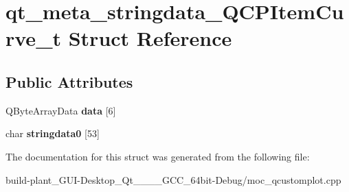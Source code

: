 \hypertarget{structqt__meta__stringdata__QCPItemCurve__t}{}\section{qt\+\_\+meta\+\_\+stringdata\+\_\+\+Q\+C\+P\+Item\+Curve\+\_\+t Struct Reference}
\label{structqt__meta__stringdata__QCPItemCurve__t}
\subsection*{Public Attributes}
\begin{DoxyCompactItemize}
\item 
\mbox{\label{structqt__meta__stringdata__QCPItemCurve__t_ac6d43f09ee6cd9ad95da06d7fd942e8f}} 
Q\+Byte\+Array\+Data {\bfseries data} \mbox{[}6\mbox{]}
\item 
\mbox{\label{structqt__meta__stringdata__QCPItemCurve__t_a52ddb589fe5c4e7eba75b1eb50799729}} 
char {\bfseries stringdata0} \mbox{[}53\mbox{]}
\end{DoxyCompactItemize}


The documentation for this struct was generated from the following file\+:\begin{DoxyCompactItemize}
\item 
build-\/plant\+\_\+\+G\+U\+I-\/\+Desktop\+\_\+\+Qt\+\_\+\_\+\_\+\_\+\+G\+C\+C\+\_\+64bit-\/\+Debug/moc\+\_\+qcustomplot.\+cpp\end{DoxyCompactItemize}

